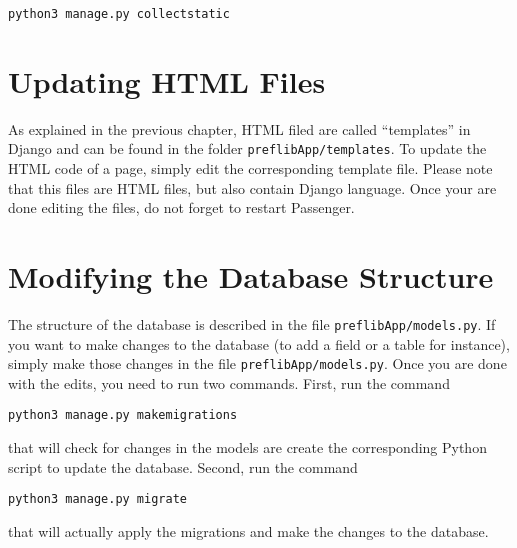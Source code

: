 \documentclass{report}
\begin{document}
	\begin{center}
		\texttt{python3 manage.py collectstatic}
	\end{center}
	
	\section{Updating HTML Files}
	
	As explained in the previous chapter, HTML filed are called ``templates'' in Django and can be found in the folder \texttt{preflibApp/templates}. To update the HTML code of a page, simply edit the corresponding template file. Please note that this files are HTML files, but also contain Django language. Once your are done editing the files, do not forget to restart Passenger.
	
	\section{Modifying the Database Structure}
	
	The structure of the database is described in the file \texttt{preflibApp/models.py}. If you want to make changes to the database (to add a field or a table for instance), simply make those changes in the file \texttt{preflibApp/models.py}. Once you are done with the edits, you need to run two commands. First, run the command
	
	\begin{center}
		\texttt{python3 manage.py makemigrations}
	\end{center}

	\noindent that will check for changes in the models are create the corresponding Python script to update the database. Second, run the command
	
	\begin{center}
		\texttt{python3 manage.py migrate}
	\end{center}

	\noindent that will actually apply the migrations and make the changes to the database.
	
	
\end{document}
